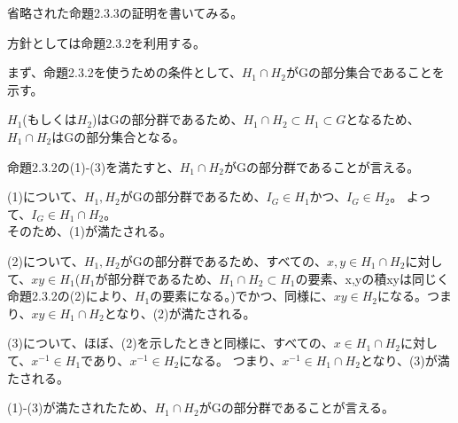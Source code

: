 \documentclass{jsarticle}
\begin{document}
省略された命題2.3.3の証明を書いてみる。

方針としては命題2.3.2を利用する。

まず、命題2.3.2を使うための条件として、$H_1 \cap H_2$がGの部分集合であることを示す。

$H_1$(もしくは$H_2$)はGの部分群であるため、$H_1 \cap H_2 \subset H_1 \subset G$となるため、$H_1 \cap H_2$はGの部分集合となる。

命題2.3.2の(1)-(3)を満たすと、$H_1 \cap H_2$がGの部分群であることが言える。

(1)について、$H_1,H_2$がGの部分群であるため、$I_G \in H_1$かつ、$I_G \in H_2$。
よって、$I_G \in H_1 \cap H_2$。\\
そのため、(1)が満たされる。

(2)について、$H_1,H_2$がGの部分群であるため、すべての、$x, y \in H_1 \cap H_2$に対して、$xy \in H_1$($H_1$が部分群であるため、$H_1 \cap H_2 \subset H_1$の要素、x,yの積xyは同じく命題2.3.2の(2)により、$H_1$の要素になる。)でかつ、同様に、$xy \in H_2$になる。つまり、$xy \in H_1 \cap H_2$となり、(2)が満たされる。

(3)について、ほぼ、(2)を示したときと同様に、すべての、$x \in H_1 \cap H_2$に対して、$x^{-1} \in H_1$であり、$x^{-1} \in H_2$になる。
つまり、$x^{-1} \in H_1 \cap H_2$となり、(3)が満たされる。

(1)-(3)が満たされたため、$H_1 \cap H_2$がGの部分群であることが言える。
\end{document}

